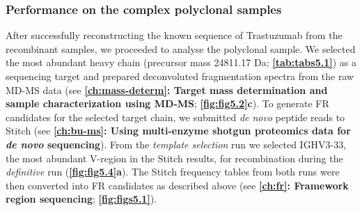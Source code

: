 \subsubsection{Performance on the complex polyclonal samples}
After successfully reconstructing the known sequence of Trastuzumab from the recombinant samples, we proceeded to analyse the polyclonal sample. We selected the most abundant heavy chain (precursor mass 24811.17 Da; \textbf{\autoref{tab:tabs5.1}}) as a sequencing target and prepared deconvoluted fragmentation spectra from the raw MD-MS data (see \textbf{\autoref{ch:mass-determ}: Target mass determination and sample characterization using MD-MS}; \textbf{\autoref{fig:fig5.2}c}). To generate FR candidates for the selected target chain, we submitted \emph{de novo} peptide reads to Stitch (see \textbf{\autoref{ch:bu-ms}: Using multi-enzyme shotgun proteomics data for \emph{de novo} sequencing}). From the \emph{template selection} run we selected IGHV3-33, the most abundant V-region in the Stitch results, for recombination during the \emph{definitive} run (\textbf{\autoref{fig:fig5.4}a}). The Stitch frequency tables from both runs were then converted into FR candidates as described above (see \textbf{\autoref{ch:fr}: Framework region sequencing}; \textbf{\autoref{fig:figs5.1}}).
